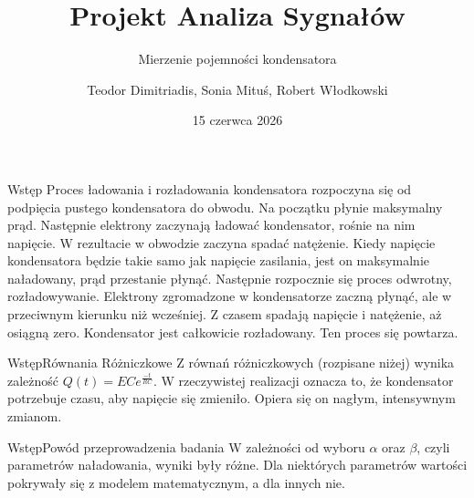 \documentclass[8pt]{beamer}
\title{Projekt Analiza Sygnałów}
\subtitle{Mierzenie pojemności kondensatora}
\author{Teodor Dimitriadis, Sonia Mituś, Robert Włodkowski}
\date{15 czerwca 2026}
\begin{document}
\begin{frame}
\titlepage
\end{frame}
\begin{frame}{Wstęp}
Proces ładowania i rozładowania kondensatora rozpoczyna się od podpięcia pustego kondensatora do obwodu. Na początku płynie maksymalny prąd. Następnie elektrony zaczynają ładować kondensator, rośnie na nim napięcie. W rezultacie w obwodzie zaczyna spadać natężenie. Kiedy napięcie kondensatora będzie takie samo jak napięcie zasilania, jest on maksymalnie naładowany, prąd przestanie płynąć. Następnie rozpocznie się proces odwrotny, rozładowywanie. Elektrony zgromadzone w kondensatorze zaczną płynąć, ale w przeciwnym kierunku niż wcześniej. Z czasem spadają napięcie i natężenie, aż osiągną zero. Kondensator jest całkowicie rozładowany. Ten proces się powtarza.
\end{frame}
\begin{frame}{Wstęp}{Równania Różniczkowe}
Z równań różniczkowych (rozpisane niżej) wynika zależność $Q(t) = ECe^{\frac{-t}{RC}}$. W rzeczywistej realizacji oznacza to, że kondensator potrzebuje czasu, aby napięcie się zmieniło. Opiera się on nagłym, intensywnym zmianom.
\end{frame}
\begin{frame}{Wstęp}{Powód przeprowadzenia badania}
W zależności od wyboru $\alpha$ oraz $\beta$, czyli parametrów naładowania, wyniki były różne. Dla niektórych parametrów wartości pokrywały się z modelem matematycznym, a dla innych nie.
\end{frame}
\end{document}
